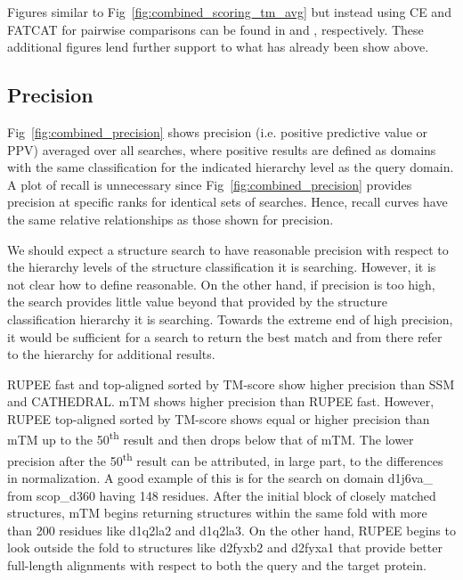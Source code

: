 \documentclass[10pt,letterpaper]{article}
\renewcommand{\figurename}{Fig}
\begin{document}
Figures similar to \figurename~\ref{fig:combined_scoring_tm_avg} but instead using CE and FATCAT for pairwise comparisons can be found in  and , respectively. 
These additional figures lend further support to what has already been show above.

\subsection*{Precision}

\figurename~\ref{fig:combined_precision} shows precision (i.e. positive predictive value or PPV) averaged over all searches, where positive results are defined as domains with the same classification for the indicated hierarchy level as the query domain. 
A plot of recall is unnecessary since \figurename~\ref{fig:combined_precision} provides precision at specific ranks for identical sets of searches. 
Hence, recall curves have the same relative relationships as those shown for precision. 

\begin{figure*}[!h]
\caption{Precision for RUPEE fast, RUPEE top-aligned sorted by TM-score, and RUPEE top-aligned sorted by RMSD}
\label{fig:combined_precision}
\end{figure*}

We should expect a structure search to have reasonable precision with respect to the hierarchy levels of the structure classification it is searching. 
However, it is not clear how to define reasonable. 
On the other hand, if precision is too high, the search provides little value beyond that provided by the structure classification hierarchy it is searching. 
Towards the extreme end of high precision, it would be sufficient for a search to return the best match and from there refer to the hierarchy for additional results. 

RUPEE fast and top-aligned sorted by TM-score show higher precision than SSM and CATHEDRAL.
mTM shows higher precision than RUPEE fast. 
However, RUPEE top-aligned sorted by TM-score shows equal or higher precision than mTM up to the 50\textsuperscript{th} result and then drops below that of mTM. 
The lower precision after the 50\textsuperscript{th} result can be attributed, in large part, to the differences in normalization. 
A good example of this is for the search on domain d1j6va\_ from scop\_d360 having 148 residues.
After the initial block of closely matched structures, mTM begins returning structures within the same fold with more than 200 residues like d1q2la2 and d1q2la3.
On the other hand, RUPEE begins to look outside the fold to structures like d2fyxb2 and d2fyxa1 that provide better full-length alignments with respect to both the query and the target protein.  
\end{document}
